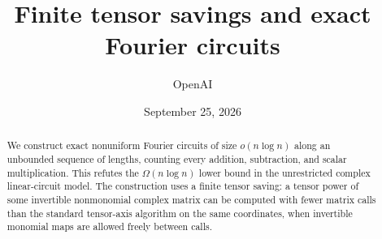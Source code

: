 \documentclass[11pt]{article}
\title{Finite tensor savings and exact Fourier circuits}
\author{OpenAI}
\date{September 25, 2026}
\numberwithin{equation}{section}
\theoremstyle{definition}
\theoremstyle{remark}
\begin{document}
\maketitle
\begin{abstract}
We construct exact nonuniform Fourier circuits of size $o(n\log n)$ along an
unbounded sequence of lengths, counting every addition, subtraction, and scalar
multiplication. This refutes the $\Omega(n\log n)$ lower bound in the unrestricted
complex linear-circuit model. The construction uses a finite tensor saving:
a tensor power of some invertible nonmonomial complex matrix can be computed
with fewer matrix calls than the standard tensor-axis algorithm on the same
coordinates, when invertible monomial maps are allowed freely between calls.
\end{abstract}
\tableofcontents










\end{document}
